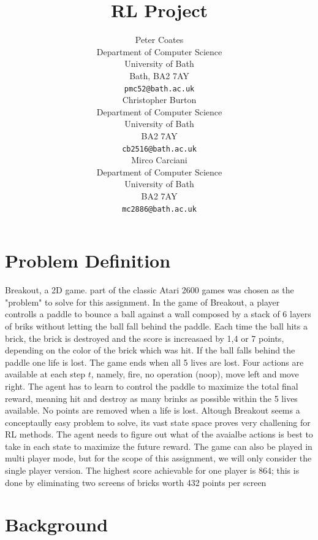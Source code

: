 \documentclass{article}
\title{RL Project}
\author{
  Peter Coates
  \\
  Department of Computer Science\\
  University of Bath\\
  Bath, BA2 7AY \\
  \texttt{pmc52@bath.ac.uk} \\
\And
  Christopher Burton\\
  Department of Computer Science\\
  University of Bath \\
  BA2 7AY\\
  \texttt{cb2516@bath.ac.uk} \\
\And
  Mirco Carciani\\
  Department of Computer Science\\
  University of Bath \\
  BA2 7AY\\
  \texttt{mc2886@bath.ac.uk} \\
}
\begin{document}
\maketitle

\section{Problem Definition}

Breakout, a 2D game. part of the classic Atari 2600 games was chosen as the "problem" to solve for this assignment.
In the game of Breakout, a player controlls a paddle to bounce a ball against a wall composed by a stack of 6 layers of briks without letting the ball fall behind the paddle. Each time the ball hits a brick, the brick is destroyed and the score is increasaed by 1,4 or 7 points, depending on the color of the brick which was hit. If the ball falls behind the paddle one life is lost. The game ends when all 5 lives are lost.
Four actions are available at each step $t$, namely, fire, no operation (noop), move left and move right.
The agent has to learn to control the paddle to maximize the  total final reward, meaning hit and destroy as many brinks as possible within the 5 lives available. No points are removed when a life is lost. Altough Breakout seems a conceptaully easy problem to solve, its vast state space proves very challening for RL methods. The agent needs to figure out what of the avaialbe actions is best to take in each state  to maximize the future reward.  The game can also be played in multi player mode, but for the scope of this assignment, we will only consider the single player version. The highest score achievable for one player is 864; this is done by eliminating two screens of bricks worth 432 points per screen   

\section{Background}

\end{document}
